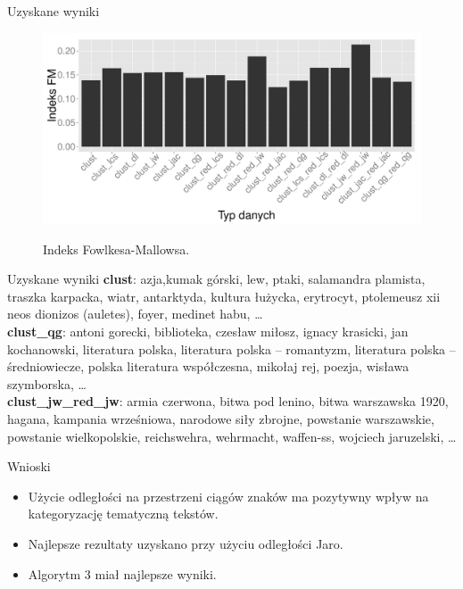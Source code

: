 \documentclass[11pt,pdftex,mathserif]{beamer}
\theoremstyle{definition}
\begin{document}
\begin{frame}{Uzyskane wyniki}
\begin{figure}[!h]
  \centering
  \includegraphics[width=350pt]{plot6.pdf}\\
  \caption{Indeks Fowlkesa-Mallowsa.}\label{plot:005}
\end{figure}
\end{frame}

\begin{frame}{Uzyskane wyniki}
\textbf{clust}: azja,kumak górski, lew, ptaki, salamandra plamista, traszka karpacka, wiatr, antarktyda, kultura łużycka, erytrocyt, ptolemeusz xii neos dionizos (auletes), foyer, medinet habu, \ldots \\ \pause 
\textbf{clust\_qg}: antoni gorecki, biblioteka, czesław miłosz, ignacy krasicki, jan kochanowski, literatura polska, literatura polska – romantyzm, literatura polska – średniowiecze, polska literatura współczesna, mikołaj rej, poezja, wisława szymborska, \ldots \\ \pause 
\textbf{clust\_jw\_red\_jw}: armia czerwona, bitwa pod lenino, bitwa warszawska 1920, hagana, kampania wrześniowa, narodowe siły zbrojne, powstanie warszawskie, powstanie wielkopolskie, reichswehra, wehrmacht, waffen-ss, wojciech jaruzelski, \ldots \\ 

\end{frame}

\begin{frame}{Wnioski}
\begin{itemize}
\item Użycie odległości na przestrzeni ciągów znaków ma pozytywny wpływ na kategoryzację tematyczną tekstów.
\item Najlepsze rezultaty uzyskano przy użyciu odległości Jaro.
\item Algorytm 3 miał najlepsze wyniki.
\end{itemize}
\end{frame}
\end{document}
